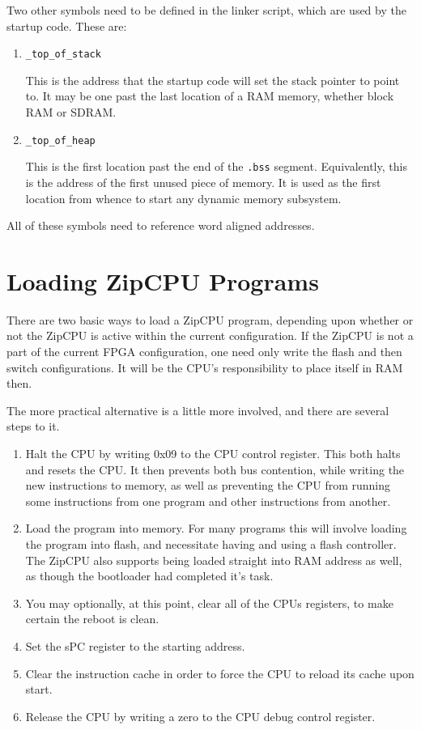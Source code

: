\documentclass{gqtekspec}
\begin{document}
Two other symbols need to be defined in the linker script, which are used
by the startup code.  These are:
\begin{enumerate}
\item {\tt \_top\_of\_stack}

	This is the address that the startup code will set the stack pointer
	to point to.  It may be one past the last location of a RAM memory,
	whether block RAM or SDRAM.

\item {\tt \_top\_of\_heap}

	This is the first location past the end of the {\tt .bss} segment.
	Equivalently, this is the address of the first unused piece of
	memory.  It is used as the first location from whence to start
	any dynamic memory subsystem.
\end{enumerate}

All of these symbols need to reference word aligned addresses.
\section{Loading ZipCPU Programs}
There are two basic ways to load a ZipCPU program, depending upon whether or
not the ZipCPU is active within the current configuration.  If the ZipCPU
is not a part of the current FPGA configuration, one need only write the 
flash and then switch configurations.  It will be the CPU's responsibility
to place itself in RAM then. 

The more practical alternative is a little more involved, and there are
several steps to it.
\begin{enumerate}
\item Halt the CPU by writing 0x09 to the CPU control register.  This
	both halts and resets the CPU.  It then prevents both bus contention,
	while writing the new instructions to memory, as well as preventing the
	CPU from running some instructions from one program and other
	instructions from another.

\item Load the program into memory.  For many programs this will involve
	loading the program into flash, and necessitate having and using a 
	flash controller.  The ZipCPU also supports being loaded straight into
	RAM address as well, as though the bootloader had completed
	it's task.

\item You may optionally, at this point, clear all of the CPUs registers,
	to make certain the reboot is clean.

\item Set the sPC register to the starting address. 

\item Clear the instruction cache in order to force the CPU to reload its
	cache upon start.

\item Release the CPU by writing a zero to the CPU debug control register.
\end{enumerate}
\end{document}
